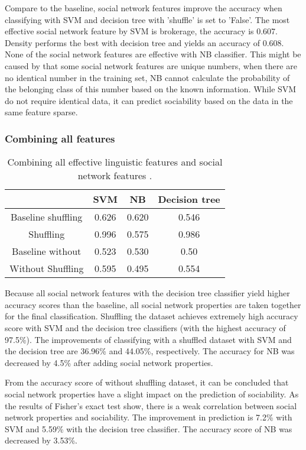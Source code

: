 \documentclass[
10pt, %
a4paper, %
oneside, %
headinclude,footinclude, %
] {book}%
\begin{document}
Compare to the baseline, social network features improve the accuracy when classifying with SVM and decision tree with 'shuffle' is set to 'False'. The most effective social network feature by SVM is brokerage, the accuracy is 0.607. Density performs the best with decision tree and yields an accuracy of 0.608. None of the social network features are effective with NB classifier. This might be caused by that some social network features are unique numbers, when there are no identical number in the training set, NB cannot calculate the probability of the belonging class of this number based on the known information. While SVM do not require identical data, it can predict sociability based on the data in the same feature sparse.

\subsubsection{Combining all features}
\begin{table}[hbtp]\centering
\caption{Combining all effective linguistic features and social network features .\label{table:all}}
\begin{tabular}{|cccc|}
\hline
 & SVM & NB & Decision tree\\
\hline
Baseline shuffling &0.626 & 0.620 & 0.546\\
Shuffling & 0.996 & 0.575 & 0.986\\
Baseline without & 0.523 & 0.530 & 0.50\\
Without Shuffling & 0.595 & 0.495 & 0.554\\
\hline
\end{tabular}
\end{table}
Because all social network features with the decision tree classifier yield higher accuracy scores than the baseline, all social network properties are taken together for the final classification. Shuffling the dataset achieves extremely high accuracy score with SVM and the decision tree classifiers (with the highest accuracy of 97.5\%). The improvements of classifying with a shuffled dataset with SVM and the decision tree are 36.96\% and 44.05\%, respectively. The accuracy for NB was decreased by 4.5\% after adding social network properties. 

From the accuracy score of without shuffling dataset, it can be concluded that social network properties have a slight impact on the prediction of sociability. As the results of Fisher’s exact test show, there is a weak correlation between social network properties and sociability. The improvement in prediction is 7.2\% with SVM and 5.59\% with the decision tree classifier. The accuracy score of NB was decreased by 3.53\%.
\end{document}
